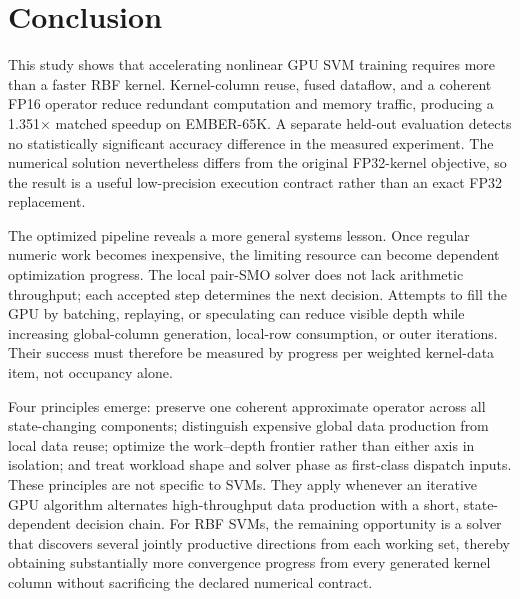 \section{Conclusion}

This study shows that accelerating nonlinear GPU SVM training requires more
than a faster RBF kernel. Kernel-column reuse, fused dataflow, and a coherent
FP16 operator reduce redundant computation and memory traffic, producing a
1.351$\times$ matched speedup on EMBER-65K. A separate held-out evaluation
detects no statistically significant accuracy difference in the measured
experiment. The numerical solution nevertheless differs from the original
FP32-kernel objective, so the result is a useful low-precision execution
contract rather than an exact FP32 replacement.

The optimized pipeline reveals a more general systems lesson. Once regular
numeric work becomes inexpensive, the limiting resource can become dependent
optimization progress. The local pair-SMO solver does not lack arithmetic
throughput; each accepted step determines the next decision. Attempts to fill
the GPU by batching, replaying, or speculating can reduce visible depth while
increasing global-column generation, local-row consumption, or outer
iterations. Their success must therefore be measured by progress per weighted
kernel-data item, not occupancy alone.

Four principles emerge: preserve one coherent approximate operator across all
state-changing components; distinguish expensive global data production from
local data reuse; optimize the work--depth frontier rather than either axis in
isolation; and treat workload shape and solver phase as first-class dispatch
inputs. These principles are not specific to SVMs. They apply whenever an
iterative GPU algorithm alternates high-throughput data production with a
short, state-dependent decision chain. For RBF SVMs, the remaining opportunity
is a solver that discovers several jointly productive directions from each
working set, thereby obtaining substantially more convergence progress from
every generated kernel column without sacrificing the declared numerical
contract.
